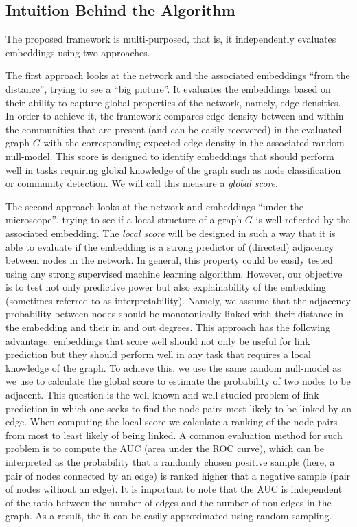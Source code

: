 \documentclass[11pt]{article}
\begin{document}
\subsection{Intuition Behind the Algorithm}\label{sec:framework1}

The proposed framework is multi-purposed, that is, it independently evaluates embeddings using two approaches.

The first approach looks at the network and the associated embeddings ``from the distance'', trying to see a ``big picture''. It evaluates the embeddings based on their ability to capture global properties of the network, namely, edge densities. In order to achieve it, the framework compares edge density between and within the communities that are present (and can be easily recovered) in the evaluated graph $G$ with the corresponding expected edge density in the associated random null-model. This score is designed to identify embeddings that should perform well in tasks requiring global knowledge of the graph such as node classification or community detection. We will call this measure a \emph{global score}.

The second approach looks at the network and embeddings ``under the microscope'', trying to see if a local structure of a graph $G$ is well reflected by the associated embedding. The \emph{local score} will be designed in such a way that it is able to evaluate if the embedding is a strong predictor of (directed) adjacency between nodes in the network. In general, this property could be easily tested using any strong supervised machine learning algorithm. However, our objective is to test not only predictive power but also explainability of the embedding (sometimes referred to as interpretability). Namely, we assume that the adjacency probability between nodes should be monotonically linked with their distance in the embedding and their in and out degrees. This approach has the following advantage: embeddings that score well should not only be useful for link prediction but they should perform well in any task that requires a local knowledge of the graph. To achieve this, we use the same random null-model as we use to calculate the global score to estimate the probability of two nodes to be adjacent. This question is the well-known and well-studied problem of link prediction in which one seeks to find the node pairs most likely to be linked by an edge. When computing the local score we calculate a ranking of the node pairs from most to least likely of being linked. A common evaluation method for such problem is to compute the AUC (area under the ROC curve), which can be interpreted as the probability that a randomly chosen positive sample (here, a pair of nodes connected by an edge) is ranked higher that a negative sample (pair of nodes without an edge). It is important to note that the AUC is independent of the ratio between the number of edges and the number of non-edges in the graph. As a result, the it can be easily approximated using random sampling.
\end{document}
